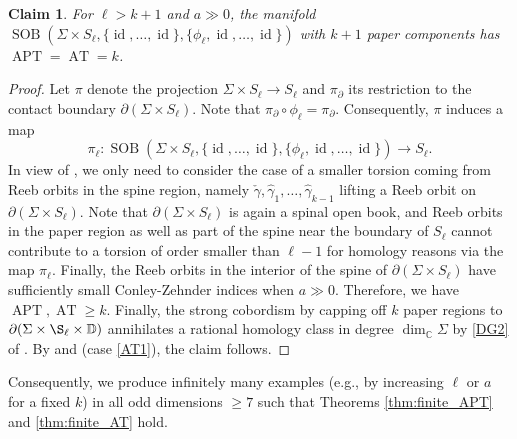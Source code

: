 \documentclass[11pt]{amsart}
\numberwithin{equation}{section}
\newtheorem{claim}[theorem]{\textbf{Claim}}
\def\C{{\mathbb C}}
\def\D{{\mathbb D}}
\DeclareMathOperator{\Id}{id}
\DeclareMathOperator{\APT}{APT}
\DeclareMathOperator{\AT}{AT}
\DeclareMathOperator{\SOB}{SOB}
\begin{document}
\begin{claim}
For $\ell > k+1$ and $a\gg 0$, the manifold $\SOB(\Sigma \times S_{\ell}, \{\Id,\ldots,\Id\}, \{\phi_{\ell},\Id,\ldots,\Id\})$ with $k+1$ paper components has $\APT=\AT=k$.
\end{claim}
\begin{proof}
Let $\pi$ denote the projection $\Sigma \times S_{\ell} \to S_{\ell}$ and $\pi_{\partial}$ its restriction to the contact boundary $\partial(\Sigma\times S_{\ell})$. Note that $\pi_{\partial}\circ \phi_{\ell}=\pi_{\partial}$. Consequently, $\pi$ induces a map $$\pi_{\ell}: \SOB(\Sigma \times S_{\ell}, \{\Id,\ldots,\Id\}, \{\phi_{\ell},\Id,\ldots,\Id\}) \to S_{\ell}.$$ In view of , we only need to consider the case of a smaller torsion coming from Reeb orbits in the spine region, namely $\check{\gamma},\hat{\gamma}_1,\ldots,\hat{\gamma}_{k-1}$ lifting a Reeb orbit on $\partial(\Sigma \times S_{\ell})$. Note that $\partial(\Sigma \times S_{\ell})$ is again a spinal open book, and Reeb orbits in the paper region as well as part of the spine near the boundary of $S_{\ell}$ cannot contribute to a torsion of order smaller than $\ell-1$ for homology reasons via the map $\pi_{\ell}$. Finally, the Reeb orbits in the interior of the spine of $\partial(\Sigma \times S_{\ell})$ have sufficiently small Conley-Zehnder indices when $a\gg 0$. Therefore, we have $\APT, \AT\ge k$. Finally, the strong cobordism by capping off $k$ paper regions to $\partial(\Sigma \times \S_{\ell}\times \D)$ annihilates a rational homology class in degree $\dim_{\C}\Sigma$ by \eqref{DG2} of . By  and  (case \eqref{AT1}), the claim follows. 
\end{proof}
Consequently, we produce infinitely many examples (e.g., by increasing $\ell$ or $a$ for a fixed $k$) in all odd dimensions $\ge 7$ such that Theorems \ref{thm:finite_APT} and \ref{thm:finite_AT} hold.
\end{document}
